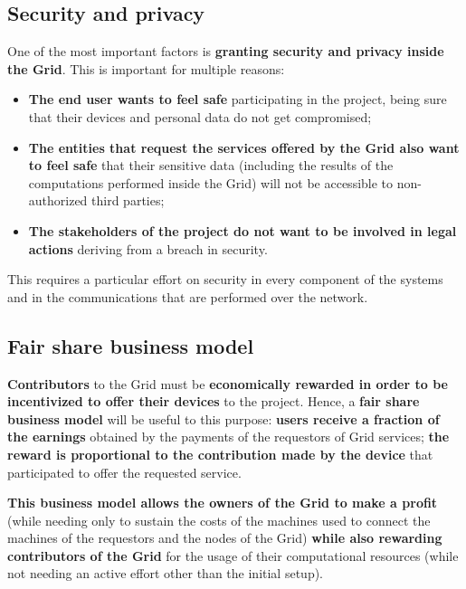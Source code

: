 \subsection{Security and privacy}
One of the most important factors is \textbf{granting security and privacy inside the Grid}. This is important for multiple reasons:
\begin{itemize}
    \item \textbf{The end user wants to feel safe }participating in the project, being sure that their devices and personal data do not get compromised;
    \item \textbf{The entities that request the services offered by the Grid also want to feel safe} that their sensitive data (including the results of the computations performed inside the Grid) will not be accessible to non-authorized third parties;
    \item \textbf{The stakeholders of the project do not want to be involved in legal actions} deriving from a breach in security.
\end{itemize}

This requires a particular effort on security in every component of the systems and in the communications that are performed over the network.

\subsection{Fair share business model}\label{fair_share_business_model}
\textbf{Contributors} to the Grid must be \textbf{economically rewarded in order to be incentivized to offer their devices} to the project. Hence, a \textbf{fair share business model} will be useful to this purpose: \textbf{users receive a fraction of the earnings} obtained by the payments of the requestors of Grid services; \textbf{the reward is proportional to the contribution made by the device} that participated to offer the requested service.

\textbf{This business model allows the owners of the Grid to make a profit} (while needing only to sustain the costs of the machines used to connect the machines of the requestors and the nodes of the Grid) \textbf{while also rewarding contributors of the Grid} for the usage of their computational resources (while not needing an active effort other than the initial setup).
